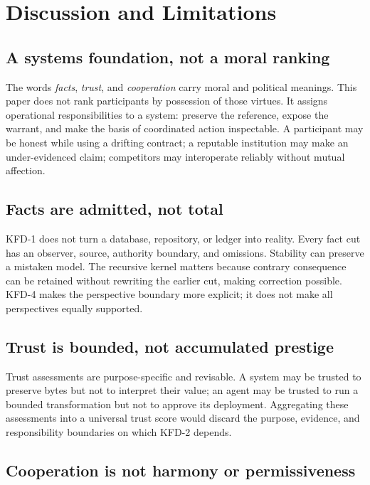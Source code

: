 \section{Discussion and Limitations}
\label{sec:discussion}

\subsection{A systems foundation, not a moral ranking}

The words \emph{facts}, \emph{trust}, and \emph{cooperation} carry moral and
political meanings. This paper does not rank participants by possession of
those virtues. It assigns operational responsibilities to a system: preserve
the reference, expose the warrant, and make the basis of coordinated action
inspectable. A participant may be honest while using a drifting contract; a
reputable institution may make an under-evidenced claim; competitors may
interoperate reliably without mutual affection.

\subsection{Facts are admitted, not total}

KFD-1 does not turn a database, repository, or ledger into reality. Every fact
cut has an observer, source, authority boundary, and omissions. Stability can
preserve a mistaken model. The recursive kernel matters because contrary
consequence can be retained without rewriting the earlier cut, making
correction possible. KFD-4 makes the perspective boundary more explicit; it
does not make all perspectives equally supported.

\subsection{Trust is bounded, not accumulated prestige}

Trust assessments are purpose-specific and revisable. A system may be trusted
to preserve bytes but not to interpret their value; an agent may be trusted to
run a bounded transformation but not to approve its deployment. Aggregating
these assessments into a universal trust score would discard the purpose,
evidence, and responsibility boundaries on which KFD-2 depends.

\subsection{Cooperation is not harmony or permissiveness}

